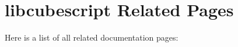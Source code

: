 \section{libcubescript Related Pages}
Here is a list of all related documentation pages:\begin{CompactList}
\item {}

\end{CompactList}

